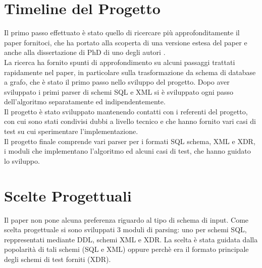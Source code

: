 \documentclass[a4paper,10pt]{article}
\begin{document}

\section{Timeline del Progetto}

Il primo passo effettuato è stato quello di ricercare più approfonditamente il paper fornitoci, che ha portato alla scoperta di una versione estesa del paper \cite{sfpaper_ext} e anche alla dissertazione di PhD di uno degli autori \cite{generic_model_man}.\\

La ricerca ha fornito spunti di approfondimento su alcuni passaggi trattati rapidamente nel paper, in particolare sulla trasformazione da schema di database a grafo, che è stato il primo passo nello sviluppo del progetto.
Dopo aver sviluppato i primi parser di schemi SQL e XML si è sviluppato ogni passo dell’algoritmo separatamente ed indipendentemente.\\

Il progetto è stato sviluppato mantenendo contatti con i referenti del progetto, con cui sono stati condivisi dubbi a livello tecnico e che hanno fornito vari casi di test su cui sperimentare l’implementazione.\\

Il progetto finale comprende vari parser per i formati SQL schema, XML e XDR, i moduli che implementano l’algoritmo ed alcuni casi di test, che hanno guidato lo sviluppo.\\


\section{Scelte Progettuali}
\label{Scelte Progettuali}

Il paper non pone alcuna preferenza riguardo al tipo di schema di input. Come scelta progettuale si sono sviluppati 3 moduli di parsing: uno per schemi SQL, reppresentati mediante DDL, schemi XML e XDR. La scelta è stata guidata dalla popolarità di tali schemi (SQL e XML) oppure perchè era il formato principale degli schemi di test forniti (XDR).\\
\end{document}
